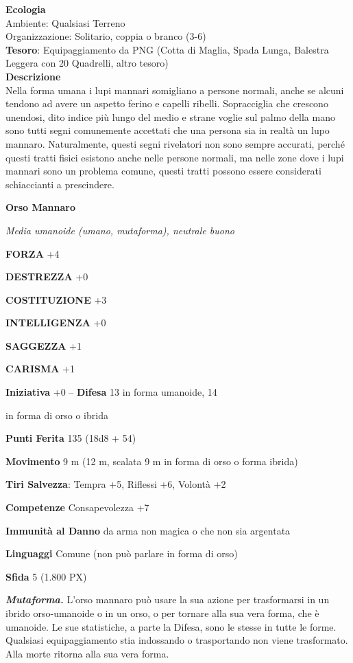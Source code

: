 \begin{multicols}{2}
\textbf{Ecologia}\\
Ambiente: Qualsiasi Terreno\\
Organizzazione: Solitario, coppia o branco (3-6)\\
\textbf{Tesoro}: Equipaggiamento da PNG (Cotta di Maglia, Spada Lunga, Balestra Leggera con 20 Quadrelli, altro tesoro)\\
\textbf{Descrizione}\\
Nella forma umana i lupi mannari somigliano a persone normali, anche se alcuni tendono ad avere un aspetto ferino e capelli ribelli. Sopracciglia che crescono unendosi, dito indice più lungo del medio e strane voglie sul palmo della mano sono tutti segni comunemente accettati che una persona sia in realtà un lupo mannaro. Naturalmente, questi segni rivelatori non sono sempre accurati, perché questi tratti fisici esistono anche nelle persone normali, ma nelle zone dove i lupi mannari sono un problema comune, questi tratti possono essere considerati schiaccianti a prescindere.

\medskip{}\textbf{Orso Mannaro}

\textit{Media umanoide (umano, mutaforma), neutrale buono}

\textbf{FORZA} +4

\textbf{DESTREZZA} +0

\textbf{COSTITUZIONE} +3

\textbf{INTELLIGENZA} +0

\textbf{SAGGEZZA} +1

\textbf{CARISMA} +1

\textbf{Iniziativa} +0 -- \textbf{Difesa} 13 in forma umanoide, 14

in forma di orso o ibrida

\textbf{Punti Ferita} 135 (18d8 + 54)

\textbf{Movimento} 9 m (12 m, scalata 9 m in forma di orso o forma ibrida)

\textbf{Tiri Salvezza}: Tempra +5, Riflessi +6, Volontà +2

\textbf{Competenze} Consapevolezza +7

\textbf{Immunità al Danno} da arma non magica o che non sia argentata

\textbf{Linguaggi} Comune (non può parlare in forma di orso)

\textbf{Sfida} 5 (1.800 PX)

\textit{\textbf{Mutaforma.}} L'orso mannaro può usare la sua azione per trasformarsi in un ibrido orso-umanoide o in un orso, o per tornare alla sua vera forma, che è umanoide. Le sue statistiche, a parte la Difesa, sono le stesse in tutte le forme. Qualsiasi equipaggiamento stia indossando o trasportando non viene trasformato. Alla morte ritorna alla sua vera forma.


\end{multicols}
